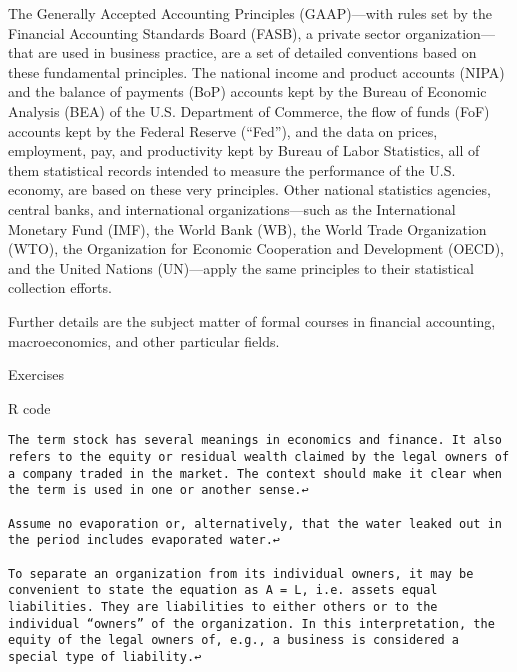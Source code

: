 \documentclass[
]{article}
\begin{document}
The Generally Accepted Accounting Principles (GAAP)---with rules set by
the Financial Accounting Standards Board (FASB), a private sector
organization---that are used in business practice, are a set of detailed
conventions based on these fundamental principles. The national income
and product accounts (NIPA) and the balance of payments (BoP) accounts
kept by the Bureau of Economic Analysis (BEA) of the U.S. Department of
Commerce, the flow of funds (FoF) accounts kept by the Federal Reserve
(``Fed''), and the data on prices, employment, pay, and productivity
kept by Bureau of Labor Statistics, all of them statistical records
intended to measure the performance of the U.S. economy, are based on
these very principles. Other national statistics agencies, central
banks, and international organizations---such as the International
Monetary Fund (IMF), the World Bank (WB), the World Trade Organization
(WTO), the Organization for Economic Cooperation and Development (OECD),
and the United Nations (UN)---apply the same principles to their
statistical collection efforts.

Further details are the subject matter of formal courses in financial
accounting, macroeconomics, and other particular fields.

Exercises

R code

\begin{verbatim}
The term stock has several meanings in economics and finance. It also refers to the equity or residual wealth claimed by the legal owners of a company traded in the market. The context should make it clear when the term is used in one or another sense.↩︎

Assume no evaporation or, alternatively, that the water leaked out in the period includes evaporated water.↩︎

To separate an organization from its individual owners, it may be convenient to state the equation as A = L, i.e. assets equal liabilities. They are liabilities to either others or to the individual “owners” of the organization. In this interpretation, the equity of the legal owners of, e.g., a business is considered a special type of liability.↩︎
\end{verbatim}
\end{document}
